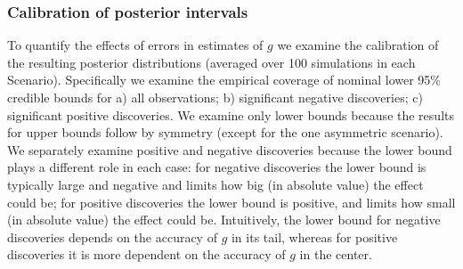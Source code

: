 \documentclass[11pt]{article}
\begin{document}

\subsubsection*{Calibration of posterior intervals}

To quantify the effects of errors in estimates of $g$ we examine the calibration of the resulting posterior distributions (averaged over 100 simulations in each Scenario). 
Specifically we examine the empirical coverage of nominal lower 95\% credible bounds for a) all observations; b) significant negative discoveries; c) significant positive discoveries.  We examine only lower bounds because the results for upper bounds follow by 
symmetry (except for the one asymmetric scenario). We separately examine positive and negative discoveries because the lower bound plays a different role
in each case: for negative discoveries the lower bound is typically large and negative and limits how big (in absolute value) 
the effect could be; for positive discoveries the lower bound 
is positive, and limits how small (in absolute value) the effect could be. Intuitively, the lower bound for negative discoveries depends on the accuracy of $g$ in its tail,
whereas for positive discoveries it is more dependent on the accuracy of $g$ in the center.
\end{document}
